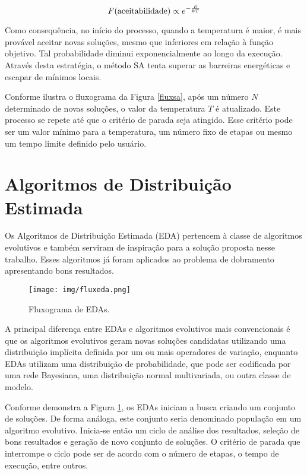 \documentclass[dm,ppgcomp]{texfurg}
\begin{document}
\begin{equation}\label{anneq}
F({\rm aceitabilidade}) \propto e^{-\frac{E}{kT}}$$
\end{equation}

Como consequência, no início do processo, quando a temperatura é maior, é mais provável aceitar novas soluções, mesmo que inferiores em relação à função objetivo. Tal probabilidade diminui exponencialmente ao longo da execução. Através desta estratégia, o método SA tenta superar as barreiras energéticas e escapar de mínimos locais. 

Conforme ilustra o fluxograma da Figura \ref{fluxsa}, após um número $N$ determinado de novas soluções, o valor da temperatura $T$ é atualizado. Este processo se repete até que o critério de parada seja atingido. Esse critério pode ser um valor mínimo para a temperatura, um número fixo de etapas ou mesmo um tempo limite definido pelo usuário.

\section{Algoritmos de Distribuição Estimada}

Os Algoritmos de Distribuição Estimada (EDA) pertencem à classe de algoritmos evolutivos e também serviram de inspiração para a solução proposta nesse trabalho. Esses algoritmos já foram aplicados ao problema de dobramento apresentando bons resultados. 

\begin{figure}[htbp]
  \centering \texttt{[image: img/fluxeda.png]}
\caption{Fluxograma de EDAs.} 
\label{fluxeda}
\end{figure}

A principal diferença entre EDAs e algoritmos evolutivos mais convencionais é que os algoritmos evolutivos geram novas soluções candidatas utilizando uma distribuição implícita definida por um ou mais operadores de variação, enquanto EDAs utilizam uma distribuição de probabilidade, que pode ser codificada por uma rede Bayesiana, uma distribuição normal multivariada, ou outra classe de modelo.

Conforme demonstra a Figura \ref{fluxeda}, os EDAs iniciam a busca criando um conjunto de soluções. De forma análoga, este conjunto seria denominado população em um algoritmo evolutivo. Inicia-se então um ciclo de análise dos resultados, seleção de bons resultados e geração de novo conjunto de soluções. O critério de parada que interrompe o ciclo pode ser de acordo com o número de etapas, o tempo de execução, entre outros.
\end{document}
